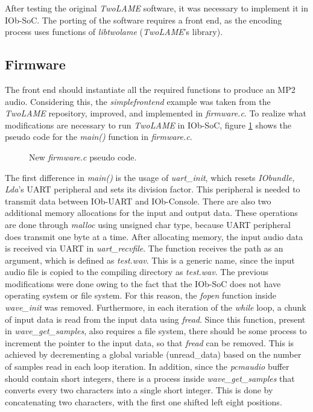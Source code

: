 \documentclass{article}
\begin{document}
After testing the original \textit{TwoLAME} software, it was necessary to implement it in IOb-SoC. The porting of the software requires a front end, as the encoding process uses functions of \textit{libtwolame} (\textit{TwoLAME}'s library). 

\subsection{Firmware}

The front end should instantiate all the required functions to produce an MP2 audio. Considering this, the \textit{simplefrontend} example was taken from the \textit{TwoLAME} repository, improved, and implemented in \textit{firmware.c}.
To realize what modifications are necessary to run \textit{TwoLAME} in IOb-SoC, figure \ref{newpseudo} shows the pseudo code for the \textit{main()} function in \textit{firmware.c}.

\begin{figure}[H]
\centerline{}
\caption{New \textit{firmware.c} pseudo code.}
\label{newpseudo}
\end{figure}

The first difference in \textit{main()} is the usage of \textit{uart\_init}, which resets \textit{IObundle, Lda}’s UART peripheral and sets its division factor. This peripheral is needed to transmit data between IOb-UART and IOb-Console. 
There are also two additional memory allocations for the input and output data. These operations are done through \textit{malloc} using unsigned char type, because UART peripheral does transmit one byte at a time.
After allocating memory, the input audio data is received via UART in \textit{uart\_recvfile}. The function receives the path as an argument, which is defined as \textit{test.wav}. This is a generic name, since the input audio file is copied to the compiling directory as \textit{test.wav}.
The previous modifications were done owing to the fact that the IOb-SoC does not have operating system or file system. For this reason, the \textit{fopen} function inside \textit{wave\_init} was removed. Furthermore, in each iteration of the \textit{while} loop, a chunk of input data is read from the input data using \textit{fread}. Since this function, present in \textit{wave\_get\_samples}, also requires a file system, there should be some process to increment the pointer to the input data, so that \textit{fread} can be removed. This is achieved by decrementing a global variable (unread\_data) based on the number of samples read in each loop iteration. In addition, since the \textit{pcmaudio} buffer should contain short integers, there is a process inside \textit{wave\_get\_samples} that converts every two characters into a single short integer. This is done by concatenating two characters, with the first one shifted left eight positions.
\end{document}
